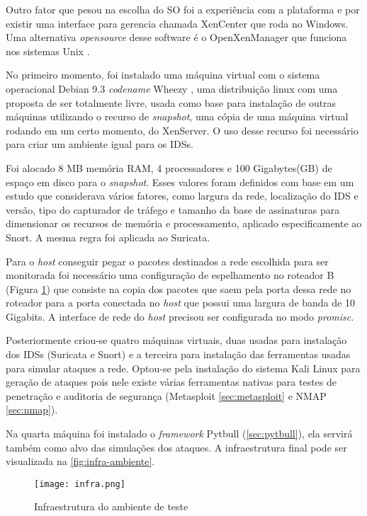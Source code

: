 Outro fator que pesou na escolha do SO foi a experiência com a plataforma e por existir uma interface para gerencia chamada XenCenter que roda no Windows. Uma alternativa \textit{opensource} desse software é o OpenXenManager que funciona nos sistemas Unix \cite{openxenmanager}.

No primeiro momento, foi instalado uma máquina virtual com o sistema operacional Debian 9.3 \textit{codename} Wheezy \cite{debianwheezy}, uma distribuição linux com uma proposta de ser totalmente livre, usada como base para instalação de outras máquinas utilizando o recurso de \textit{snapshot}, uma cópia de uma máquina virtual rodando em um certo momento, do XenServer. O uso desse recurso foi necessário para criar um ambiente igual para os IDSs.

Foi alocado 8 MB memória RAM, 4 processadores e 100 Gigabytes(GB) de espaço em disco para o \textit{snapshot}. Esses valores foram definidos com base em um estudo \cite{mikelococo} que considerava vários fatores, como largura da rede, localização do IDS e versão, tipo do capturador de tráfego e tamanho da base de assinaturas para dimensionar os recursos de memória e processamento, aplicado especificamente ao Snort. A mesma regra foi aplicada ao Suricata.

Para o \textit{host} conseguir pegar o pacotes destinados a rede escolhida para ser monitorada foi necessário uma configuração de espelhamento no roteador B (Figura \ref{fig:infra-ambiente}) que consiste na copia dos pacotes que saem pela porta dessa rede no roteador para a porta conectada no \textit{host} que possui uma largura de banda de 10 Gigabits. A interface de rede do \textit{host} precisou ser configurada no modo \textit{promisc}.

Posteriormente criou-se quatro máquinas virtuais, duas usadas para instalação dos IDSs (Suricata e Snort) e a terceira para instalação das ferramentas usadas para simular ataques a rede. Optou-se pela instalação do sistema Kali Linux \cite{kalilinux} para geração de ataques pois nele existe várias ferramentas nativas para testes de penetração e auditoria de segurança (Metasploit \autoref{sec:metasploit} e NMAP \autoref{sec:nmap}). 

Na quarta máquina foi instalado o \textit{framework} Pytbull (\autoref{sec:pytbull}), ela servirá também como alvo das simulações dos ataques. A infraestrutura final pode ser visualizada na \autoref{fig:infra-ambiente}.

 \begin{figure}[!htb]
  \centering
  \caption{Infraestrutura do ambiente de teste}
  \texttt{[image: infra.png]}
  \label{fig:infra-ambiente}
 \end{figure}

